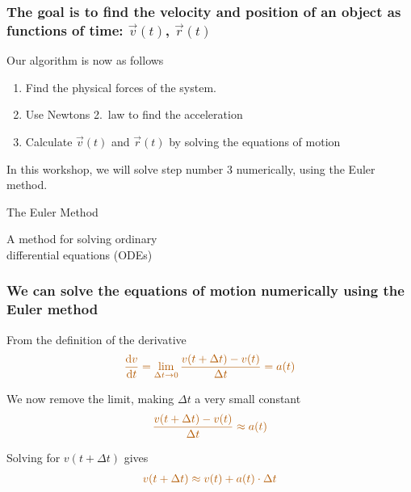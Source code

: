 \documentclass[english, 12pt]{beamer}
\newcommand{\alrt}{\color{AlertColor}}
\renewcommand{\d}{\textrm{d}}
\begin{document}
\begin{frame}[fragile]
\frametitle{The goal is to find the velocity and position of an object as functions of time: $\vec{v}(t)$, $\vec{r}(t)$}

Our algorithm is now as follows 

\begin{enumerate}
	\item Find the physical forces of the system.
	\item Use Newtons 2.\ law to find the acceleration
	\item Calculate $\vec{v}(t)$ and $\vec{r}(t)$ by solving the equations of motion
\end{enumerate}

 {
\vspace{1cm}
	In this workshop, we will solve step number 3 numerically, using the Euler method.
}



\end{frame}



\begin{frame}[fragile]
\begin{center}
{\Huge \color{DarkFern} The Euler Method}

\vspace{1cm}

A method for solving ordinary \\ differential equations (ODEs)
\end{center}
\end{frame}

\begin{frame}[fragile]
\frametitle{We can solve the equations of motion numerically using the Euler method}

 {	
From the definition of the derivative
\begin{align*}
\alrt \frac{\d v}{\d t} = \lim_{\Delta t \to 0} \frac{v(t+\Delta t) - v(t)}{\Delta t} =  a(t)
\end{align*}
}

 {
We now remove the limit, making $\Delta t$ a very small constant
\begin{align*}
\alrt \frac{v(t+\Delta t) - v(t)}{\Delta t} \approx  a(t)
\end{align*}
}

 {
Solving for $v(t+\Delta t)$ gives
\begin{align*}
\alrt v(t+\Delta t) \approx v(t) + a(t)\cdot \Delta t
\end{align*}
}
\end{frame}
\end{document}
